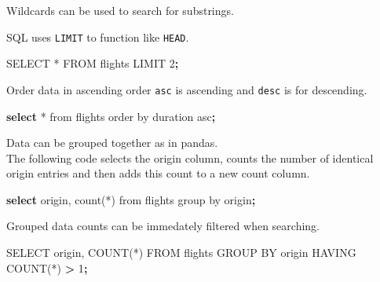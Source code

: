 \documentclass[]{book}
\newenvironment{Shaded}{\begin{snugshade}}{\end{snugshade}}
\newcommand{\KeywordTok}[1]{\textcolor[rgb]{0.13,0.29,0.53}{\textbf{#1}}}
\newcommand{\StringTok}[1]{\textcolor[rgb]{0.31,0.60,0.02}{#1}}
\newcommand{\OperatorTok}[1]{\textcolor[rgb]{0.81,0.36,0.00}{\textbf{#1}}}
\newcommand{\ExtensionTok}[1]{#1}
\newcommand{\NormalTok}[1]{#1}
\begin{document}
Wildcards can be used to search for substrings.

\begin{Shaded}
\end{Shaded}

SQL uses \texttt{LIMIT} to function like \texttt{HEAD}.

\begin{Shaded}
\begin{Highlighting}[]
\ExtensionTok{SELECT}\NormalTok{ * FROM flights LIMIT 2}\KeywordTok{;}
\end{Highlighting}
\end{Shaded}

Order data in ascending order \texttt{asc} is ascending and
\texttt{desc} is for descending.

\begin{Shaded}
\begin{Highlighting}[]
\KeywordTok{select} \ExtensionTok{*}\NormalTok{ from flights order by duration asc}\KeywordTok{;}
\end{Highlighting}
\end{Shaded}

Data can be grouped together as in pandas.\\
The following code selects the origin column, counts the number of
identical origin entries and then adds this count to a new count column.

\begin{Shaded}
\begin{Highlighting}[]
\KeywordTok{select} \ExtensionTok{origin}\NormalTok{, count(*) }\ExtensionTok{from}\NormalTok{ flights group by origin}\KeywordTok{;}
\end{Highlighting}
\end{Shaded}

Grouped data counts can be immedately filtered when searching.

\begin{Shaded}
\begin{Highlighting}[]
\ExtensionTok{SELECT}\NormalTok{ origin, COUNT(*) }\ExtensionTok{FROM}\NormalTok{ flights GROUP BY origin HAVING COUNT(*) }\OperatorTok{>} \ExtensionTok{1}\KeywordTok{;}
\end{Highlighting}
\end{Shaded}
\end{document}
